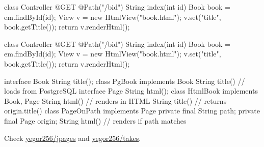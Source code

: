 \documentclass{article}
\begin{document}

\begin{pptWide}{2}
{\small\begin{ffcode}
class Controller {
  @GET
  @Path("/b{id}")
  String index(int id) {
    Book book = em.findById(id);
    View v = new HtmlView("book.html");
    v.set("title", book.getTitle());
    return v.renderHtml();
  }
}
\end{ffcode}
}
\par\columnbreak\par
{}
\end{pptWide}
\par
\plush{}

\begin{pptWide}{2}
{\small\begin{ffcode}
class Controller {
  @GET
  @Path("/b{id}")
  String index(int id) {
    Book book = em.findById(id);
    View v = new HtmlView("book.html");
    v.set("title", book.getTitle());
    return v.renderHtml();
  }
}
\end{ffcode}
}
\par\columnbreak\par
{\scriptsize\begin{ffcode}
interface Book
  String title();
class PgBook implements Book
  String title() // loads from PostgreSQL
interface Page
  String html();
class HtmlBook implements Book, Page
  String html() // renders in HTML
  String title() // returns origin.title()
class PageOnPath implements Page
  private final String path;
  private final Page origin;
  String html() // renders if path matches
\end{ffcode}
}
\end{pptWide}
\par
Check \href{https://github.com/yegor256/jpages}{yegor256/jpages} and \href{https://github.com/yegor256/takes}{yegor256/takes}.
\plush{}
\end{document}
